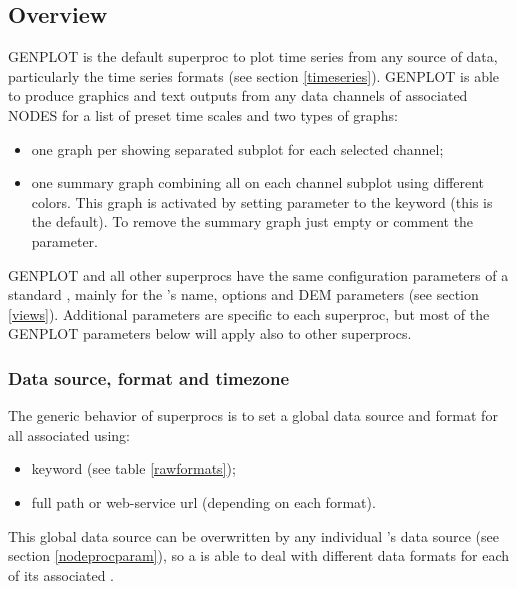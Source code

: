 \subsection{Overview}

GENPLOT is the default superproc to plot time series from any source of data, particularly the time series formats (see section \ref{timeseries}). GENPLOT is able to produce graphics and text outputs from any data channels of associated NODES for a list of preset time scales and two types of graphs:
\begin{itemize}
\item one graph per  showing separated subplot for each selected channel;
\item one summary graph combining all  on each channel subplot using different colors. This graph is activated by setting  parameter to the keyword  (this is the default). To remove the summary graph just empty or comment the parameter.
\end{itemize}

GENPLOT and all other superprocs have the same configuration parameters of a standard , mainly for the 's name,  options and DEM parameters (see section \ref{views}). Additional parameters are specific to each superproc, but most of the GENPLOT parameters below will apply also to other superprocs.

\subsubsection{Data source, format and timezone}

The generic behavior of superprocs is to set a global data source and format for all associated  using:
\begin{itemize}
\item {} keyword (see table \ref{rawformats});
\item {} full path or web-service url (depending on each format).
\end{itemize}

This global  data source can be overwritten by any individual 's data source (see section \ref{nodeprocparam}), so a  is able to deal with different data formats for each of its associated .

